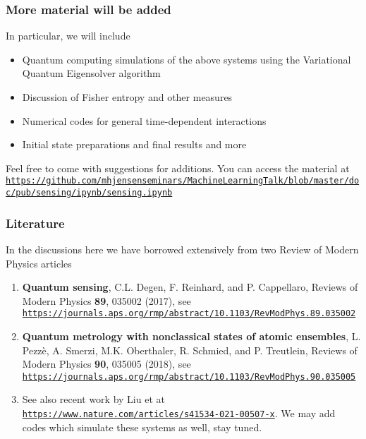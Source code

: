 \documentclass{beamer}
\begin{document}
\begin{frame}
\frametitle{More material will be added}

In particular, we will include
\begin{itemize}
\item Quantum computing simulations of the above systems using the Variational Quantum Eigensolver algorithm

\item Discussion of Fisher entropy and other measures

\item Numerical codes for general time-dependent interactions

\item Initial state preparations and final results and more
\end{itemize}

\noindent
Feel free to come with suggestions for additions. You can access the material at \href{{https://github.com/mhjensenseminars/MachineLearningTalk/blob/master/doc/pub/sensing/ipynb/sensing.ipynb}}{\nolinkurl{https://github.com/mhjensenseminars/MachineLearningTalk/blob/master/doc/pub/sensing/ipynb/sensing.ipynb}}
\end{frame}

\begin{frame}
\frametitle{Literature}

In the discussions here we have borrowed extensively from two Review of Modern Physics
articles
\begin{enumerate}
\item \textbf{Quantum sensing}, C.L. Degen, F. Reinhard, and P. Cappellaro, Reviews of  Modern  Physics \textbf{89}, 035002 (2017), see \href{{https://journals.aps.org/rmp/abstract/10.1103/RevModPhys.89.035002}}{\nolinkurl{https://journals.aps.org/rmp/abstract/10.1103/RevModPhys.89.035002}}

\item \textbf{Quantum metrology with nonclassical states of atomic ensembles}, L. Pezzè, A. Smerzi, M.K. Oberthaler, R. Schmied, and P. Treutlein, Reviews of  Modern  Physics \textbf{90}, 035005 (2018), see \href{{https://journals.aps.org/rmp/abstract/10.1103/RevModPhys.90.035005}}{\nolinkurl{https://journals.aps.org/rmp/abstract/10.1103/RevModPhys.90.035005}}

\item See also recent work by Liu et at \href{{https://www.nature.com/articles/s41534-021-00507-x}}{\nolinkurl{https://www.nature.com/articles/s41534-021-00507-x}}. We may add codes which simulate these systems as well, stay tuned.
\end{enumerate}

\noindent
\end{frame}
\end{document}
